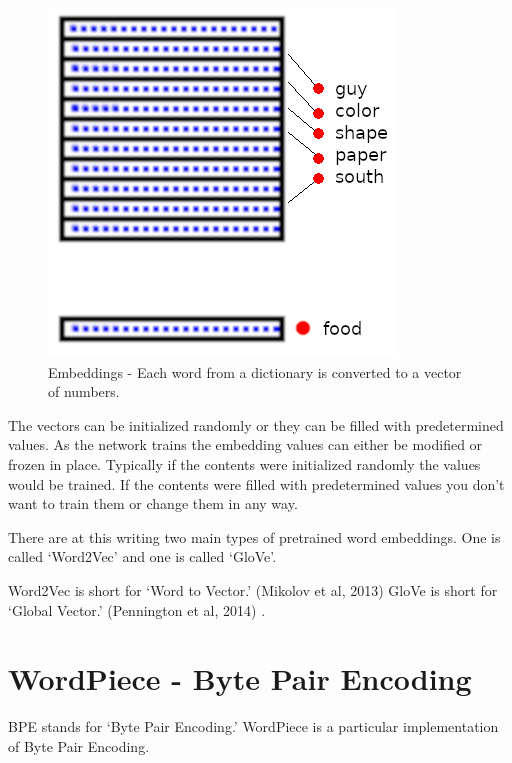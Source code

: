 \begin{figure}[H]
	\begin{center}
	\includegraphics[scale=0.5]{diagram-embedding}
	
	
\end{center}
	\caption[Word Embeddings]{Embeddings - Each word from a dictionary is converted to a vector of numbers.}
	
\end{figure}

The vectors can be initialized randomly or they can be filled with predetermined values. As the network trains the embedding values can either be modified or frozen in place. Typically if the contents were initialized randomly the values would be trained. If the contents were filled with predetermined values you don\textquoteright t want to train them or change them in any way. 

There are at this writing two main types of pretrained word embeddings. One is called \textquoteleft Word2Vec\textquoteright{} and one is called \textquoteleft GloVe\textquoteright . 

Word2Vec is short for \textquoteleft Word to Vector.\textquoteright{} (Mikolov et al, 2013)\cite{mikolov2013efficient} GloVe is short for \textquoteleft Global Vector.\textquoteright{} (Pennington et al, 2014)\cite{pennington-etal-2014-glove} .


\section{WordPiece - Byte Pair Encoding}

\ac{BPE} stands for `Byte Pair Encoding.' WordPiece is a particular implementation of Byte Pair Encoding.

